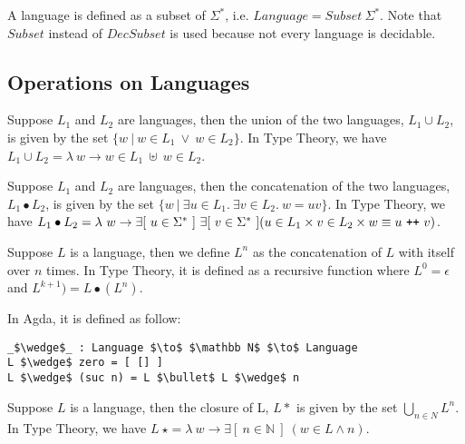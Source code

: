 \begin{defn}
\noindent A language is defined as a subset of 
\(\Sigma^*\), i.e. \(Language = Subset\ \Sigma^*\). 
Note that \(Subset\) instead of \(DecSubset\) is used because not
every language is decidable. 
\end{defn}


\subsection{Operations on Languages}

\begin{defn} 
\label{defn:lang_union}
\noindent Suppose \(L_1\) and \(L_2\) are languages, then the union of
the two languages, \(L_1\cup L_2\), is given by the set \(\{w\
|\  w \in L_1\ \vee \ w \in L_2\}\). In Type Theory, we have \(L_1 \cup L_2 = \lambda\ w
\to w \in L_1\ \uplus\ w \in L_2\).
\end{defn}

\begin{defn}
\label{defn:lang_con}
\noindent Suppose \(L_1\) and \(L_2\) are languages, then
the concatenation of the two languages, \(L_1\bullet L_2\), is given
by the set \(\{w\  |\  \exists u\in L_1.\ \exists v\in L_2.\ w = uv\}\). In
Type Theory, we have \(L_1\bullet L_2 = \lambda\ w \to \exists[\
u \in \Sigma^*\ ]\ \exists[\ v \in \Sigma^*\ ] (u \in L_1 \times v \in
L_2 \times w \equiv u\ \texttt{+}\texttt{+}\  v )\).
\end{defn}

\begin{defn}
\label{defn:lang_power}
\noindent Suppose \(L\) is a language, then we define \(L^n\) as
the concatenation of \(L\) with itself over \(n\) times. In Type
Theory, it is defined as a recursive function where \(L^0 = \epsilon\) and
\(L^{k+1}) = L \bullet (L^n)\). 
\end{defn}

\par In Agda, it is defined as follow:
\begin{lstlisting}[mathescape=true,xleftmargin=.3\textwidth]
_$\wedge$_ : Language $\to$ $\mathbb N$ $\to$ Language
L $\wedge$ zero = [ [] ]
L $\wedge$ (suc n) = L $\bullet$ L $\wedge$ n
\end{lstlisting} 


\begin{defn}
\label{defn:lang_star}
\noindent Suppose \(L\) is a language, then the closure of
L, \(L\ast\) is given by the set \(\bigcup_{n \in N} L^n\). In Type
Theory, we have \(L\ \star = \lambda\ w \to \exists [\ n \in \mathbb{N}\
]\ (w \in L \wedge n)\). 
\end{defn}


